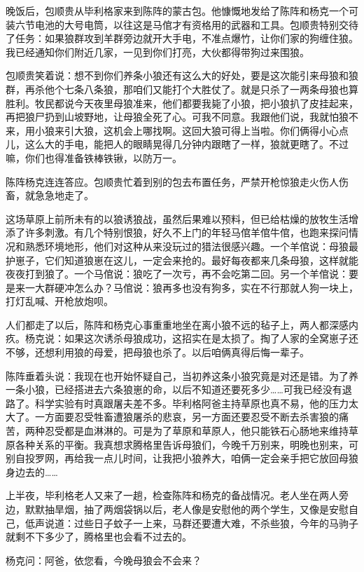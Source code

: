 \par 晚饭后，包顺贵从毕利格家来到陈阵的蒙古包。他慷慨地发给了陈阵和杨克一个可装六节电池的大号电筒，以往这是马倌才有资格用的武器和工具。包顺贵特别交待了任务：如果狼群攻到羊群旁边就开大手电，不准点爆竹，让你们家的狗缠住狼。我已经通知你们附近几家，一见到你们打亮，大伙都得带狗过来围狼。
\par 包顺贵笑着说：想不到你们养条小狼还有这么大的好处，要是这次能引来母狼和狼群，再杀他个七条八条狼，那咱们又能打个大胜仗了。就是只杀了一两条母狼也算胜利。牧民都说今天夜里母狼准来，他们都要我毙了小狼，把小狼扒了皮挂起来，再把狼尸扔到山坡野地，让母狼全死了心。可我不同意。我跟他们说，我就怕狼不来，用小狼来引大狼，这机会上哪找啊。这回大狼可得上当啦。你们俩得小心点儿，这么大的手电，能把人的眼睛晃得几分钟内跟瞎了一样，狼就更瞎了。不过嘛，你们也得准备铁棒铁锹，以防万一。
\par 陈阵杨克连连答应。包顺贵忙着到别的包去布置任务，严禁开枪惊狼走火伤人伤畜，就急急地走了。
\par 这场草原上前所未有的以狼诱狼战，虽然后果难以预料，但已给枯燥的放牧生活增添了许多刺激。有几个特别恨狼，好久不上门的年轻马倌羊倌牛倌，也跑来探问情况和熟悉环境地形，他们对这种从来没玩过的猎法很感兴趣。一个羊倌说：母狼最护崽子，它们知道狼崽在这儿，一定会来抢的。最好每夜都来几条母狼，这样就能夜夜打到狼了。一个马倌说：狼吃了一次亏，再不会吃第二回。另一个羊倌说：要是来一大群硬冲怎么办？马倌说：狼再多也没有狗多，实在不行那就人狗一块上，打灯乱喊、开枪放炮呗。
\par 人们都走了以后，陈阵和杨克心事重重地坐在离小狼不远的毡子上，两人都深感内疚。杨克说：如果这次诱杀母狼成功，这招实在是太损了。掏了人家的全窝崽子还不够，还想利用狼的母爱，把母狼也杀了。以后咱俩真得后悔一辈子。
\par 陈阵垂着头说：我现在也开始怀疑自己，当初养这条小狼究竟是对还是错。为了养一条小狼，已经搭进去六条狼崽的命，以后不知道还要死多少……可我已经没有退路了。科学实验有时真跟屠夫差不多。毕利格阿爸主持草原也真不易，他的压力太大了。一方面要忍受牲畜遭狼屠杀的悲哀，另一方面还要忍受不断去杀害狼的痛苦，两种忍受都是血淋淋的。可是为了草原和草原人，他只能铁石心肠地来维持草原各种关系的平衡。我真想求腾格里告诉母狼们，今晚千万别来，明晚也别来，可别自投罗网，再给我一点儿时间，让我把小狼养大，咱俩一定会亲手把它放回母狼身边去的……
\par 上半夜，毕利格老人又来了一趟，检查陈阵和杨克的备战情况。老人坐在两人旁边，默默抽旱烟，抽了两烟袋锅以后，老人像是安慰他的两个学生，又像是安慰自己，低声说道：过些日子蚊子一上来，马群还要遭大难，不杀些狼，今年的马驹子就剩不下多少了，腾格里也会看不过去的。
\par 杨克问：阿爸，依您看，今晚母狼会不会来？
